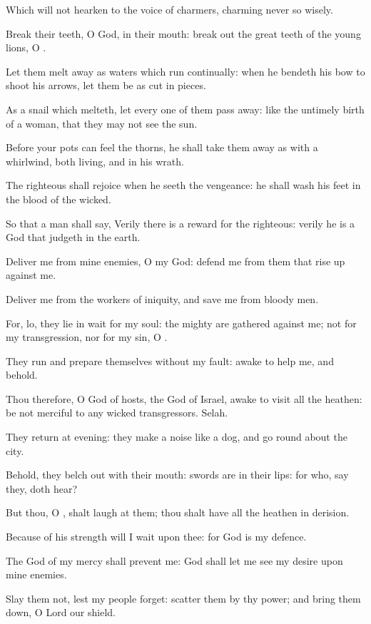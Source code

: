 \Verse Which will not hearken to the voice of charmers, charming never so wisely.

\Verse Break their teeth, O God, in their mouth: break out the great teeth of the young lions, O \LORD.

\Verse Let them melt away as waters which run continually: when he bendeth his bow to shoot his arrows, let them be as cut in pieces.

\Verse As a snail which melteth, let every one of them pass away: like the untimely birth of a woman, that they may not see the sun.

\Verse Before your pots can feel the thorns, he shall take them away as with a whirlwind, both living, and in his wrath.

\Verse The righteous shall rejoice when he seeth the vengeance: he shall wash his feet in the blood of the wicked.

\Verse So that a man shall say, Verily there is a reward for the righteous: verily he is a God that judgeth in the earth.




\Chapter
\Verse Deliver me from mine enemies, O my God: defend me from them that rise up against me.

\Verse Deliver me from the workers of iniquity, and save me from bloody men.

\Verse For, lo, they lie in wait for my soul: the mighty are gathered against me; not for my transgression, nor for my sin, O \LORD.

\Verse They run and prepare themselves without my fault: awake to help me, and behold.

\Verse Thou therefore, O \LORD God of hosts, the God of Israel, awake to visit all the heathen: be not merciful to any wicked transgressors.  Selah.

\Verse They return at evening: they make a noise like a dog, and go round about the city.

\Verse Behold, they belch out with their mouth: swords are in their lips: for who, say they, doth hear?

\Verse But thou, O \LORD, shalt laugh at them; thou shalt have all the heathen in derision.

\Verse Because of his strength will I wait upon thee: for God is my defence.

\Verse The God of my mercy shall prevent me: God shall let me see my desire upon mine enemies.

\Verse Slay them not, lest my people forget: scatter them by thy power; and bring them down, O Lord our shield.

